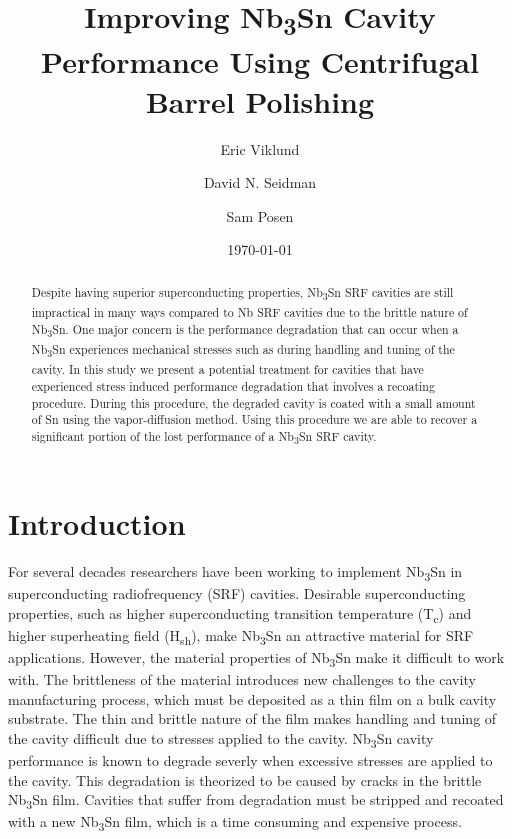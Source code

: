 \documentclass{revtex4-2}
\begin{document}
\title{Improving Nb\textsubscript{3}Sn Cavity Performance Using Centrifugal Barrel Polishing}
\author{Eric Viklund}
\author{David N. Seidman}
\author{Sam Posen}


\date{\today}

\begin{abstract}

    Despite having superior superconducting properties, Nb\textsubscript{3}Sn SRF cavities are still impractical in many ways compared to Nb SRF cavities due to the brittle nature of Nb\textsubscript{3}Sn. One major concern is the performance degradation that can occur when a Nb\textsubscript{3}Sn experiences mechanical stresses such as during handling and tuning of the cavity. In this study we present a potential treatment for cavities that have experienced stress induced performance degradation that involves a recoating procedure. During this procedure, the degraded cavity is coated with a small amount of Sn using the vapor-diffusion method. Using this procedure we are able to recover a significant portion of the lost performance of a Nb\textsubscript{3}Sn SRF cavity.

\end{abstract}

\maketitle

\section{Introduction}
\label{sec:Introduction}

For several decades researchers have been working to implement Nb\textsubscript{3}Sn in superconducting radiofrequency (SRF) cavities. Desirable superconducting properties, such as higher superconducting transition temperature (T\textsubscript{c}) and higher superheating field (H\textsubscript{sh})\cite{liarte2017theoretical, catelani2008temperature, lin2012effect, kubo2020superfluid}, make Nb\textsubscript{3}Sn an attractive material for SRF applications. However, the material properties of Nb\textsubscript{3}Sn make it difficult to work with. The brittleness of the material introduces new challenges to the cavity manufacturing process, which must be deposited as a thin film on a bulk cavity substrate.\cite{posen2017nb3sn, pudasaini2019growth, porter2018update} The thin and brittle nature of the film makes handling and tuning of the cavity difficult due to stresses applied to the cavity. Nb\textsubscript{3}Sn cavity performance is known to degrade severly when excessive stresses are applied to the cavity. This degradation is theorized to be caused by cracks in the brittle Nb\textsubscript{3}Sn film. Cavities that suffer from degradation must be stripped and recoated with a new Nb\textsubscript{3}Sn film, which is a time consuming and expensive process.
\end{document}
